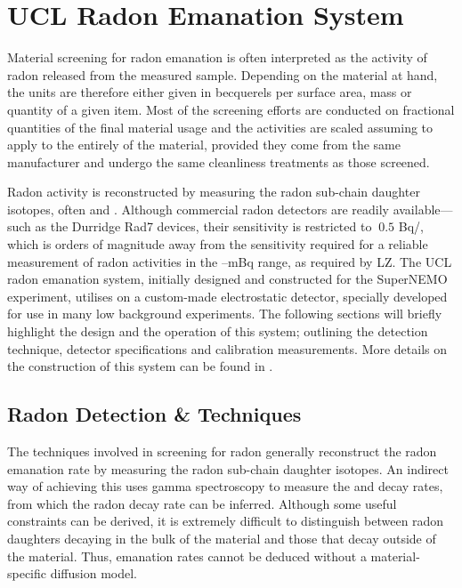 


\section{UCL Radon Emanation System}
\label{sec:ucl_radon_system}

Material screening for radon emanation is often interpreted as the activity of radon released from the measured sample. Depending on the material at hand, the units are therefore either given in becquerels per surface area, mass or quantity of a given item. Most of the screening efforts are conducted on fractional quantities of the final material usage and the activities are scaled assuming to apply to the entirely of the material, provided they come from the same manufacturer and undergo the same cleanliness treatments as those screened.

Radon activity is reconstructed by measuring the radon sub-chain daughter isotopes, often \PoTOE{} and \PoTOF{}. Although commercial radon detectors are readily available---such as the Durridge Rad7 devices, their sensitivity is restricted to $~0.5$ Bq/\cubicmeter{}, which is orders of magnitude away from the sensitivity required for a reliable measurement of radon activities in the --mBq range, as required by LZ. The UCL radon emanation system, initially designed and constructed for the SuperNEMO \neutrinolessDoubleBeta{} experiment, utilises on a custom-made electrostatic detector, specially developed for use in many low background experiments. The following sections will briefly highlight the design and the operation of this system; outlining the detection technique, detector specifications and calibration measurements. More details on the construction of this system can be found in \cite{mott_2013, xin_2017}.


\subsection{Radon Detection \& Techniques}
\label{secsec:rn_detection_techniques}

The techniques involved in screening for radon generally reconstruct the radon emanation rate by measuring the radon sub-chain daughter isotopes. An indirect way of achieving this uses gamma spectroscopy to measure the \BiTOF{} and \PbTOF{} decay rates, from which the radon decay rate can be inferred. Although some useful constraints can be derived, it is extremely difficult to distinguish between radon daughters decaying in the bulk of the material and those that decay outside of the material. Thus, emanation rates cannot be deduced without a material-specific diffusion model.

